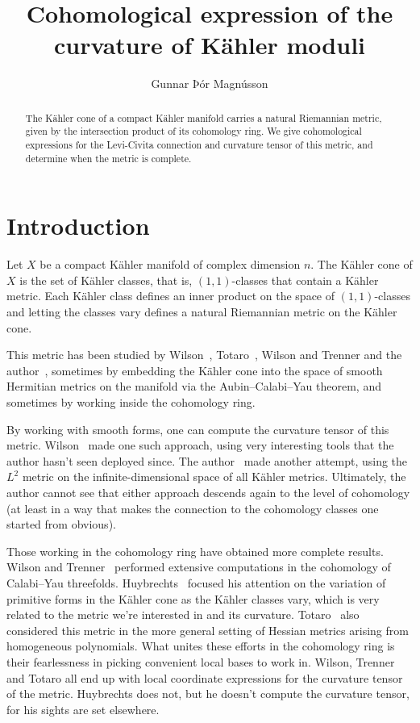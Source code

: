 \documentclass[11pt,a4paper]{amsart}
\title[Curvature of K\"ahler moduli]%
{Cohomological expression of the curvature of K\"{a}hler moduli}
\author{Gunnar Þór Magnússon}
\theoremstyle{definition}
\theoremstyle{remark}
\begin{document}
\begin{abstract}
The K\"{a}hler cone of a compact K\"ahler manifold carries a natural Riemannian
metric, given by the intersection product of its cohomology ring. We give
cohomological expressions for the Levi-Civita connection and curvature tensor of
this metric, and determine when the metric is complete.
\end{abstract}

\maketitle



\section*{Introduction}

Let $X$ be a compact K\"{a}hler manifold of complex dimension $n$. The K\"{a}hler
cone of $X$ is the set of K\"{a}hler classes, that is, $(1,1)$-classes that contain
a K\"{a}hler metric. Each K\"{a}hler class defines an inner product on the space of
$(1,1)$-classes and letting the classes vary defines a natural Riemannian metric
on the K\"{a}hler cone. 

This metric has been studied by Wilson~\cite{Wilson}, Totaro~\cite{totaro},
Wilson and Trenner \cite{WilsonTrenner} and the author~\cite{Magnusson},
sometimes by embedding the K\"{a}hler cone into the space of smooth Hermitian
metrics on the manifold via the Aubin--Calabi--Yau theorem, and sometimes by
working inside the cohomology ring.

By working with smooth forms, one can compute the curvature tensor of this
metric. Wilson~\cite{Wilson} made one such approach, using very interesting
tools that the author hasn't seen deployed since. The author~\cite{Magnusson}
made another attempt, using the $L^2$ metric on the infinite-dimensional space
of all K\"ahler metrics. Ultimately, the author cannot see that either approach
descends again to the level of cohomology (at least in a way that makes the
connection to the cohomology classes one started from obvious).

Those working in the cohomology ring have obtained more complete results.
Wilson and Trenner~\cite{WilsonTrenner} performed extensive computations in the
cohomology of Calabi--Yau threefolds. Huybrechts~\cite{Huybrechts} focused his
attention on the variation of primitive forms in the K\"{a}hler cone as the K\"{a}hler
classes vary, which is very related to the metric we're interested in and its
curvature. Totaro~\cite{totaro} also considered this metric in the more general
setting of Hessian metrics arising from homogeneous polynomials.  What unites
these efforts in the cohomology ring is their fearlessness in picking convenient
local bases to work in. Wilson, Trenner and Totaro all end up with local
coordinate expressions for the curvature tensor of the metric. Huybrechts does
not, but he doesn't compute the curvature tensor, for his sights are set
elsewhere.
\end{document}
